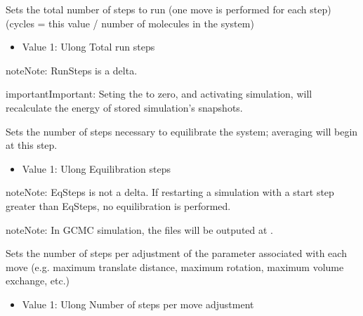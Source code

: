 \documentclass[letterpaper,10pt,english]{sphinxmanual}
\begin{document}
\begin{description}
\begin{itemize}
\end{itemize}

\item[{\sphinxcode{\sphinxupquote{RunSteps}}}] \leavevmode
\sphinxAtStartPar
Sets the total number of steps to run (one move is performed for each step) (cycles = this value / number of molecules in the system)
\begin{itemize}
\item {} 
\sphinxAtStartPar
Value 1: Ulong \sphinxhyphen{} Total run steps

\end{itemize}

\begin{sphinxadmonition}{note}{Note:}
\sphinxAtStartPar
RunSteps is a delta.
\end{sphinxadmonition}

\begin{sphinxadmonition}{important}{Important:}
\sphinxAtStartPar
Seting the  to zero, and activating  simulation, will recalculate the energy of stored simulation’s snapshots.
\end{sphinxadmonition}

\item[{\sphinxcode{\sphinxupquote{EqSteps}}}] \leavevmode
\sphinxAtStartPar
Sets the number of steps necessary to equilibrate the system; averaging will begin at this step.
\begin{itemize}
\item {} 
\sphinxAtStartPar
Value 1: Ulong \sphinxhyphen{} Equilibration steps

\end{itemize}

\begin{sphinxadmonition}{note}{Note:}
\sphinxAtStartPar
EqSteps is not a delta.  If restarting a simulation with a start step greater than EqSteps, no equilibration is performed.
\end{sphinxadmonition}

\begin{sphinxadmonition}{note}{Note:}
\sphinxAtStartPar
In GCMC simulation, the  files will be outputed at .
\end{sphinxadmonition}

\item[{\sphinxcode{\sphinxupquote{AdjSteps}}}] \leavevmode
\sphinxAtStartPar
Sets the number of steps per adjustment of the parameter associated with each move (e.g. maximum translate distance, maximum rotation, maximum volume exchange, etc.)
\begin{itemize}
\item {} 
\sphinxAtStartPar
Value 1: Ulong \sphinxhyphen{} Number of steps per move adjustment


\end{itemize}
\end{description}
\end{document}
